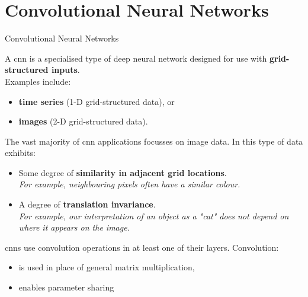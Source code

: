 \renewcommand{\prevpart}{5 }
\renewcommand{\thispart}{6 }
\renewcommand{\nextpart}{7 }

\section{Convolutional Neural Networks}





%
%
%

\begin{frame}[t,allowframebreaks]{Convolutional Neural Networks}

    A \gls{cnn} 
    is a specialised type of deep neural network designed for use 
    with {\bf grid-structured inputs}.\\
    Examples include:
    \begin{itemize}
      \item {\bf time series} (1-D grid-structured data), or 
      \item {\bf images} (2-D grid-structured data).
    \end{itemize}

    The vast majority of \gls{cnn} applications focusses on image data.
    In this type of data exhibits:
    \begin{itemize}
        \item Some degree of {\bf similarity in adjacent grid locations}.\\
          {\it For example, neighbouring pixels often have a similar colour.}
        \item A degree of {\bf translation invariance}.\\
          {\it For example, our interpretation of an object as a "cat"
          does not depend on where it appears on the image.}
    \end{itemize}

    \framebreak

    \glspl{cnn} use  \gls{convolution}
    operations in at least one of their layers.
    Convolution:
    \begin{itemize}
     \item is used in place of general matrix multiplication,
     \item enables parameter sharing 
    \end{itemize}

\end{frame}

